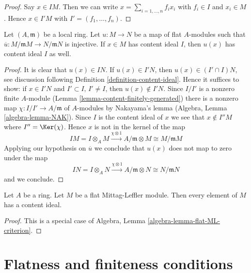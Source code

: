 \begin{proof}
Say $x \in IM$. Then we can write $x = \sum_{i = 1, \ldots, n} f_i x_i$ with
$f_i \in I$ and $x_i \in M$. Hence $x \in I'M$ with
$I' = (f_1, \ldots, f_n)$.
\end{proof}

\begin{lemma}
\label{lemma-equal-content}
Let $(A, \mathfrak m)$ be a local ring. Let $u : M \to N$ be a map of flat
$A$-modules such that $\overline{u} : M/\mathfrak m M \to N/\mathfrak m N$
is injective. If $x \in M$ has content ideal $I$, then $u(x)$ has content
ideal $I$ as well.
\end{lemma}

\begin{proof}
It is clear that $u(x) \in IN$. If $u(x) \in I'N$, then
$u(x) \in (I' \cap I)N$, see discussion following
Definition \ref{definition-content-ideal}. Hence it suffices to
show: if $x \in I'N$ and $I' \subset I$, $I' \not =  I$, then
$u(x) \not \in I'N$. Since $I/I'$ is a nonzero finite $A$-module
(Lemma \ref{lemma-content-finitely-generated}) there is a nonzero map
$\chi : I/I' \to A/\mathfrak m$ of $A$-modules
by Nakayama's lemma (Algebra, Lemma \ref{algebra-lemma-NAK}).
Since $I$ is the content ideal of $x$ we see that
$x \not \in I''M$ where $I'' = \Ker(\chi)$.
Hence $x$ is not in the kernel of the map
$$
IM = I \otimes_A M \xrightarrow{\chi \otimes 1}
A/\mathfrak m \otimes M \cong M/\mathfrak m M
$$
Applying our hypothesis on $\overline{u}$ we conclude that
$u(x)$ does not map to zero under the map
$$
IN = I \otimes_A N \xrightarrow{\chi \otimes 1}
A/\mathfrak m \otimes N \cong N/\mathfrak m N
$$
and we conclude.
\end{proof}

\begin{lemma}
\label{lemma-content-exists-flat-Mittag-Leffler}
Let $A$ be a ring. Let $M$ be a flat Mittag-Leffler module.
Then every element of $M$ has a content ideal.
\end{lemma}

\begin{proof}
This is a special case of Algebra, Lemma \ref{algebra-lemma-flat-ML-criterion}.
\end{proof}








\section{Flatness and finiteness conditions}
\label{section-flat-finite}

